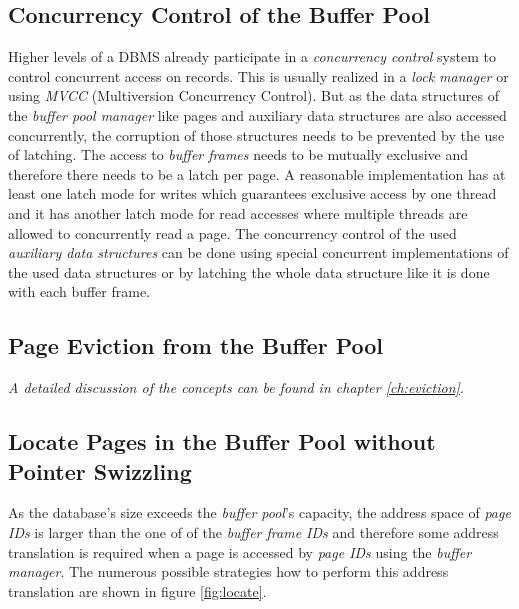 \subsection[Concurrency Control]{Concurrency Control of the Buffer Pool}

    Higher levels of a DBMS already participate in a \emph{concurrency control} system to control concurrent access on records. This is usually realized in a \emph{lock manager} or using \emph{MVCC} (Multiversion Concurrency Control). But as the data structures of the \emph{buffer pool manager} like pages and auxiliary data structures are also accessed concurrently, the corruption of those structures needs to be prevented by the use of latching. The access to \emph{buffer frames} needs to be mutually exclusive and therefore there needs to be a latch per page. A reasonable implementation has at least one latch mode for writes which guarantees exclusive access by one thread and it has another latch mode for read accesses where multiple threads are allowed to concurrently read a page. The concurrency control of the used \emph{auxiliary data structures} can be done using special concurrent implementations of the used data structures or by latching the whole data structure like it is done with each buffer frame.

\subsection[Page Eviction]{Page Eviction from the Buffer Pool}

    \textit{A detailed discussion of the concepts can be found in chapter \ref{ch:eviction}.}

\subsection[Without Pointer Swizzling]{Locate Pages in the Buffer Pool without Pointer Swizzling} \label{subsec:locatenoswizzle}

    As the database's size exceeds the \emph{buffer pool}'s capacity, the address space of \emph{page IDs} is larger than the one of of the \emph{buffer frame IDs} and therefore some address translation is required when a page is accessed by \emph{page IDs} using the \emph{buffer manager}. The numerous possible strategies how to perform this address translation are shown in figure \ref{fig:locate}.

